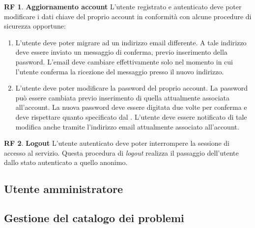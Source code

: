\documentclass[11pt, a4paper]{article}
\theoremstyle{definition}
\newtheorem{funcreq}{RF} %
\begin{document}
\begin{funcreq}
\label{updateaccount}
\textbf{Aggiornamento account }
L'utente registrato e autenticato deve poter modificare i dati chiave del
proprio account in conformità con alcune procedure di sicurezza opportune:
\begin{enumerate}
\item L'utente deve poter migrare ad un indirizzo email differente. A tale
indirizzo deve essere inviato un messaggio di conferma, previo inserimento
della password. L'email
deve cambiare effettivamente solo nel momento in cui l'utente conferma la
ricezione del messaggio presso il nuovo indirizzo.

\item L'utente deve poter modificare la password del proprio account.
La password può essere cambiata previo inserimento di quella attualmente
associata all'account. La nuova password deve essere digitata due volte
per conferma e deve rispettare quanto specificato dal
\textcolor{blue}{}. 
L'utente deve essere notificato di tale modifica anche tramite
l'indirizzo email attualmente associato all'account.
\end{enumerate}
\end{funcreq}
    
\begin{funcreq}
\label{logout}
\textbf{Logout }
L'utente autenticato deve poter interrompere la sessione di accesso
al servizio. Questa procedura di \textit{logout} realizza il passaggio dell'utente
dallo stato autenticato a quello anonimo.
\end{funcreq}

\begin{center}
    \section*{Utente amministratore}
\end{center}

\subsection{Gestione del catalogo dei problemi}
\end{document}
